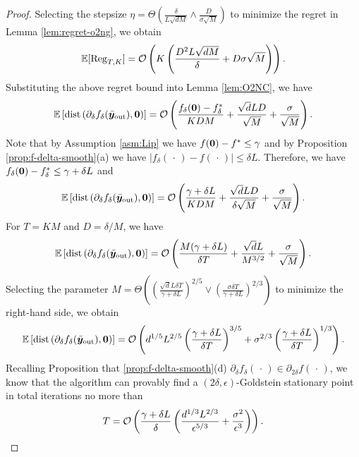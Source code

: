 \thmong*
\begin{proof}
	Selecting the stepsize $\eta = \Theta \left( \frac{\delta}{L\sqrt{d M}} \land \frac{D}{\sigma \sqrt{M}}  \right)$ to minimize the regret in Lemma \ref{lem:regret-o2ng}, we obtain
	\begin{align*}
		\mathbb{E}[{\rm Reg}_{T,K}] = {\mathcal{O}} \left( K \left( \frac{D^2 L \sqrt{dM}}{\delta} + D \sigma \sqrt{M}  \right)  \right).
	\end{align*}
	Substituting the above regret bound into Lemma \ref{lem:O2NC}, we have
	\begin{align*}
		\mathbb{E}\left[{\rm dist} \left(\partial_\delta f_{\delta}(\bar {{\bm{y}}}_{\rm out}), {\bm{0}} \right) \right] = {\mathcal{O}} \left( \frac{f_\delta({\bm{0}}) - f_\delta^*}{K DM} + \frac{\sqrt{d} LD}{\sqrt{M}} + \frac{\sigma}{\sqrt{M}} \right).
	\end{align*}
	Note that by Assumption \ref{asm:Lip} we have $f({\bm{0}}) - f^* \le \gamma$ and by Proposition \ref{prop:f-delta-smooth}(a) we have $\vert f_\delta(\,\cdot\,) - f(\,\cdot\,) \vert \le \delta L$. Therefore, we have $f_\delta({\bm{0}}) - f_\delta^* \le \gamma + \delta L$ and
	\begin{align*}
		\mathbb{E}\left[{\rm dist} \left(\partial_\delta f_{\delta}(\bar {{\bm{y}}}_{\rm out}), {\bm{0}} \right) \right] = {\mathcal{O}} \left( \frac{\gamma + \delta L}{K DM} + \frac{\sqrt{d} LD}{\delta \sqrt{M}} + \frac{\sigma}{\sqrt{M}} \right).
	\end{align*}
	For $T = KM$ and $D = \delta/ M$, we have
	\begin{align*}
		\mathbb{E}\left[{\rm dist} \left(\partial_\delta f_{\delta}(\bar {{\bm{y}}}_{\rm out}), {\bm{0}} \right) \right] = {\mathcal{O}} \left( \frac{M(\gamma + \delta L)}{\delta T} + \frac{\sqrt{d} L}{M^{3/2}} + \frac{\sigma}{\sqrt{M}} \right).
	\end{align*}
	Selecting the parameter $M = \Theta \left( \left( 
	\frac{\sqrt{d} L \delta T}{\gamma + \delta L}
	\right)^{2/5} \lor \left( \frac{\sigma \delta T}{\gamma + \delta L} \right)^{2/3} \right)$ to minimize the right-hand side, we obtain
	\begin{align*}
		\mathbb{E}\left[{\rm dist} \left(\partial_\delta f_{\delta}(\bar {{\bm{y}}}_{\rm out}), {\bm{0}} \right) \right]  = {\mathcal{O}} \left(
		d^{1/5} L^{2/5} \left( \frac{\gamma + \delta L}{\delta T} \right)^{3/5} + \sigma^{2/3} \left( \frac{\gamma + \delta L}{\delta T} \right)^{1/3}
		\right).
	\end{align*}
	Recalling Proposition that \ref{prop:f-delta-smooth}(d) $\partial_{\delta} f_{\delta}(\,\cdot\,) \in \partial_{2 \delta} f(\,\cdot\,)$, we know that the algorithm can provably find a $(2\delta,\epsilon)$-Goldstein stationary point in total iterations no more than 
	\begin{align*}
		T = {\mathcal{O}} \left( \frac{\gamma + \delta L}{\delta}  \left( \frac{ d^{1/3} L^{2/3}}{\epsilon^{5/3}} + \frac{\sigma^2}{\epsilon^3} \right) \right).
	\end{align*}
\end{proof}
